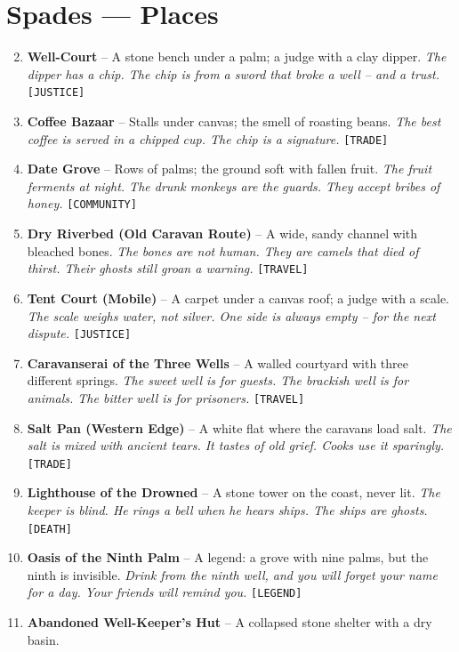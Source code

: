 \section*{Spades --- Places}
\label{sec:fhara-places}
\begin{enumerate}
\setcounter{enumi}{1}
\item \textbf{Well-Court} -- A stone bench under a palm; a judge with a clay dipper.
  \hfill \textit{The dipper has a chip. The chip is from a sword that broke a well -- and a trust.} \texttt{[JUSTICE]}
\item \textbf{Coffee Bazaar} -- Stalls under canvas; the smell of roasting beans.
  \hfill \textit{The best coffee is served in a chipped cup. The chip is a signature.} \texttt{[TRADE]}
\item \textbf{Date Grove} -- Rows of palms; the ground soft with fallen fruit.
  \hfill \textit{The fruit ferments at night. The drunk monkeys are the guards. They accept bribes of honey.} \texttt{[COMMUNITY]}
\item \textbf{Dry Riverbed (Old Caravan Route)} -- A wide, sandy channel with bleached bones.
  \hfill \textit{The bones are not human. They are camels that died of thirst. Their ghosts still groan a warning.} \texttt{[TRAVEL]}
\item \textbf{Tent Court (Mobile)} -- A carpet under a canvas roof; a judge with a scale.
  \hfill \textit{The scale weighs water, not silver. One side is always empty -- for the next dispute.} \texttt{[JUSTICE]}
\item \textbf{Caravanserai of the Three Wells} -- A walled courtyard with three different springs.
  \hfill \textit{The sweet well is for guests. The brackish well is for animals. The bitter well is for prisoners.} \texttt{[TRAVEL]}
\item \textbf{Salt Pan (Western Edge)} -- A white flat where the caravans load salt.
  \hfill \textit{The salt is mixed with ancient tears. It tastes of old grief. Cooks use it sparingly.} \texttt{[TRADE]}
\item \textbf{Lighthouse of the Drowned} -- A stone tower on the coast, never lit.
  \hfill \textit{The keeper is blind. He rings a bell when he hears ships. The ships are ghosts.} \texttt{[DEATH]}
\item \textbf{Oasis of the Ninth Palm} -- A legend: a grove with nine palms, but the ninth is invisible.
  \hfill \textit{Drink from the ninth well, and you will forget your name for a day. Your friends will remind you.} \texttt{[LEGEND]}
\item[J] \textbf{Abandoned Well-Keeper's Hut} -- A collapsed stone shelter with a dry basin.

\end{enumerate}
